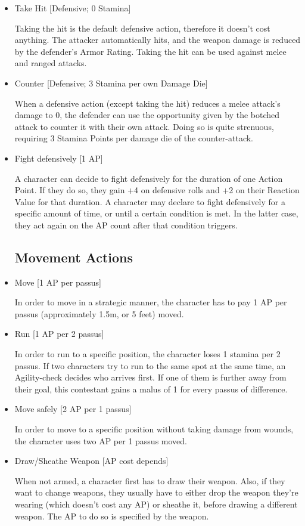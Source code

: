 \begin{itemize}
\item Take Hit [Defensive; 0 Stamina]

Taking the hit is the default defensive action, therefore it doesn’t cost anything. The attacker automatically hits, and the weapon damage is reduced by the defender’s Armor Rating. Taking the hit can be used against melee and ranged attacks.



\item Counter [Defensive; 3 Stamina per own Damage Die]

When a defensive action (except taking the hit) reduces a melee attack's damage to 0, the defender can use the opportunity given by the botched attack to counter it with their own attack. Doing so is quite strenuous, requiring 3 Stamina Points per damage die of the counter-attack.



\item Fight defensively [1 AP]

A character can decide to fight defensively for the duration of one Action Point. If they do so, they gain +4 on defensive rolls and +2 on their Reaction Value for that duration. A character may declare to fight defensively for a specific amount of time, or until a certain condition is met. In the latter case, they act again on the AP count after that condition triggers.


\subsection{Movement Actions}

\item Move [1 AP per passus]

In order to move in a strategic manner, the character has to pay 1 AP per passus (approximately 1.5m, or 5 feet) moved. 



\item Run [1 AP per 2 passus]

In order to run to a specific position, the character loses 1 stamina per 2 passus. If two characters try to run to the same spot at the same time, an Agility-check decides who arrives first. If one of them is further away from their goal, this contestant gains a malus of 1 for every passus of difference.



\item Move safely [2 AP per 1 passus]

In order to move to a specific position without taking damage from wounds, the character uses two AP per 1 passus moved.


\item Draw/Sheathe Weapon  [AP cost depends]

When not armed, a character first has to draw their weapon. Also, if they want to change weapons, they usually have to either drop the weapon they're wearing (which doesn't cost any AP) or sheathe it, before drawing a different weapon. The AP to do so is specified by the weapon.


\end{itemize}

